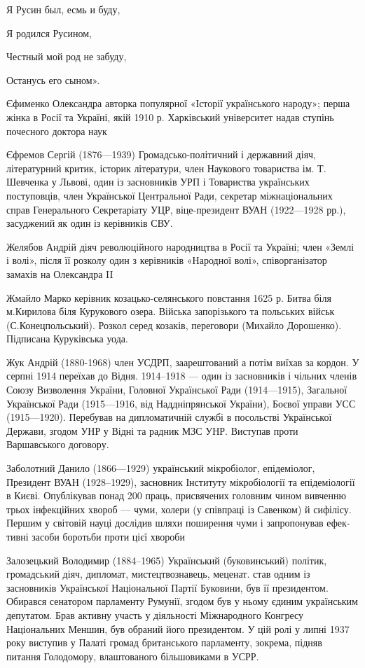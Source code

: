 Я Русин был, есмь и буду,

Я родился Русином,

Честный мой род не забуду,

Останусь его сыном».

Єфименко Олександра  авторка популярної «Історії українського народу»; перша жінка в Росії та Україні, якій 1910 р. Харківський університет надав ступінь почесного доктора наук

Єфремов Сергій (1876—1939) Громадсько-політичний і державний діяч, літературний критик, історик літератури, член Наукового товариства ім. Т. Шевченка у Львові, один із засновників УРП і Товариства українських поступовців, член Української Центральної Ради, секретар міжнаціональних справ Генерального Секретаріату УЦР, віце-президент ВУАН (1922—1928 рр.), засуджений як один із керівників СВУ.

Желябов Андрій діяч революційного народництва в Росії та Україні; член «Землі і волі», після її розколу один з керівників «Народної волі», співорганізатор замахів на Олександра II 

Жмайло  Марко керівник козацько-селянського повстання 1625 р. Битва біля м.Кирилова біля Курукового озера. Війська запорізького та польських військ (С.Конецпольський). Розкол серед козаків, переговори (Михайло Дорошенко). Підписана Куруківська уода.

Жук Андрій (1880-1968) член УСДРП, заарештований а потім  виїхав за кордон. У серпні 1914 переїхав до Відня. 1914–1918 — один із засновників і чільних членів Союзу Визволення України, Головної Української Ради (1914—1915), Загальної Української Ради (1915—1916, від Наддніпрянської України), Боєвої управи УСС (1915—1920). Перебував на дипломатичній службі в посольстві Української Держави, згодом УНР у Відні та радник МЗС УНР. Виступав проти Варшавського договору.  

Заболотний Данило (1866—1929) український мікробіолог, епідеміолог, Президент ВУАН (1928–1929), засновник Інституту мікробіології та епідеміології в Києві. Опублікував понад 200 праць, присвячених головним чином вивченню трьох інфекційних хвороб — чуми, холери (у співпраці із Савенком) й сифілісу. Першим у світовій науці дослідив шляхи поширення чуми і запропонував ефек­тивні засоби боротьби проти цієї хвороби

Залозецький Володимир (1884–1965) Український (буковинський) політик, громадський діяч, дипломат, мистецтвознавець, меценат. став одним із засновників Української Національної Партії Буковини, був її президентом. Обирався сенатором парламенту Румунії, згодом був у ньому єдиним українським депутатом. Брав активну участь у діяльності Міжнародного Конгресу Національних Меншин, був обраний його президентом. У цій ролі у липні 1937 року виступив у Палаті громад британського парламенту, зокрема, підняв питання Голодомору, влаштованого більшовиками в УСРР.

